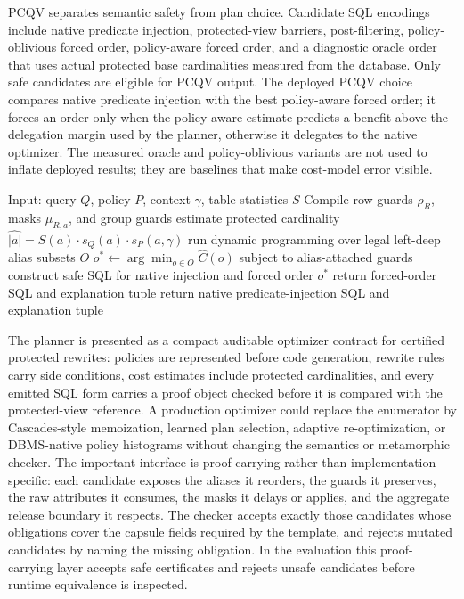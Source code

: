 \documentclass[conference]{IEEEtran}
\newcommand{\pcqv}{PCQV}
\newcommand{\ctx}{\gamma}
\begin{document}
\pcqv{} separates semantic safety from plan choice. Candidate SQL encodings include native predicate injection, protected-view barriers, post-filtering, policy-oblivious forced order, policy-aware forced order, and a diagnostic oracle order that uses actual protected base cardinalities measured from the database. Only safe candidates are eligible for \pcqv{} output. The deployed \pcqv{} choice compares native predicate injection with the best policy-aware forced order; it forces an order only when the policy-aware estimate predicts a benefit above the delegation margin used by the planner, otherwise it delegates to the native optimizer. The measured oracle and policy-oblivious variants are not used to inflate deployed results; they are baselines that make cost-model error visible.

\begin{algorithm}[t]
\caption{\pcqv{} planning for a query template $Q$}
\label{alg:pcqv}
\begin{algorithmic}[1]
\STATE Input: query $Q$, policy $P$, context $\ctx$, table statistics $S$
\STATE Compile row guards $\rho_R$, masks $\mu_{R,a}$, and group guards
  \STATE estimate protected cardinality $\widehat{|a|}=S(a)\cdot s_Q(a)\cdot s_P(a,\ctx)$
\ENDFOR
\STATE run dynamic programming over legal left-deep alias subsets $O$
\STATE $o^*\leftarrow \arg\min_{o\in O}\widehat{C}(o)$ subject to alias-attached guards
\STATE construct safe SQL for native injection and forced order $o^*$
  \STATE return forced-order SQL and explanation tuple
\ELSE
  \STATE return native predicate-injection SQL and explanation tuple
\ENDIF
\end{algorithmic}
\end{algorithm}

The planner is presented as a compact auditable optimizer contract for certified protected rewrites: policies are represented before code generation, rewrite rules carry side conditions, cost estimates include protected cardinalities, and every emitted SQL form carries a proof object checked before it is compared with the protected-view reference. A production optimizer could replace the enumerator by Cascades-style memoization, learned plan selection, adaptive re-optimization, or DBMS-native policy histograms without changing the semantics or metamorphic checker. The important interface is proof-carrying rather than implementation-specific: each candidate exposes the aliases it reorders, the guards it preserves, the raw attributes it consumes, the masks it delays or applies, and the aggregate release boundary it respects. The checker accepts exactly those candidates whose obligations cover the capsule fields required by the template, and rejects mutated candidates by naming the missing obligation. In the evaluation this proof-carrying layer accepts \ProofCertSafeAccepted{} safe certificates and rejects \ProofCertRejected{} unsafe candidates before runtime equivalence is inspected.
\end{document}
